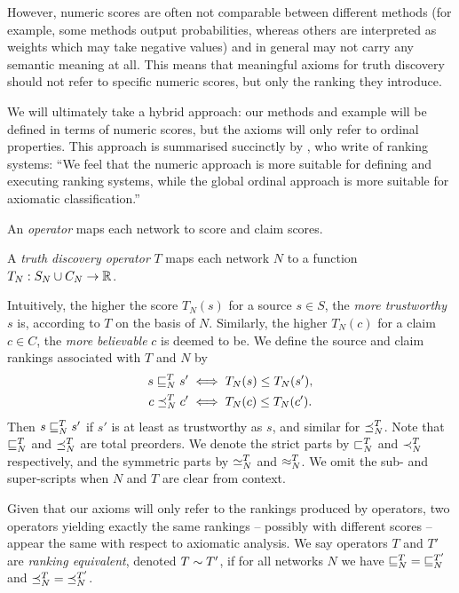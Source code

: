 However, numeric scores are often not comparable between
different methods (for example, some methods output probabilities, whereas
others are interpreted as weights which may take negative values) and in
general may not carry any semantic meaning at all. This means that meaningful
axioms for truth discovery should not refer to specific numeric scores, but
only the ranking they introduce.

We will ultimately take a hybrid approach: our methods and example will be
defined in terms of numeric scores, but the axioms will only refer to ordinal
properties. This approach is summarised succinctly by \textcite{altman2008},
who write of ranking systems: ``We feel that the numeric approach is more
suitable for defining and executing ranking systems, while the global ordinal
approach is more suitable for axiomatic classification.''

An \emph{operator} maps each network to score and claim scores.

\begin{definition}
    A \emph{truth discovery operator} $T$ maps each network $N$ to a function
    $T_N: S_N \cup C_N \to \mathbb{R}$.
\end{definition}

Intuitively, the higher the score $T_N(s)$ for a source $s \in S$, the
\emph{more trustworthy} $s$ is, according to $T$ on the basis of $N$.
Similarly, the higher $T_N(c)$ for a claim $c \in C$, the \emph{more
believable} $c$ is deemed to be. We define the source and claim rankings
associated with $T$ and $N$ by
\begin{align*}
    s \sqsubseteq_N^T s' &\iff T_N(s) \le T_N(s'), \\
    c \preceq_N^T c' &\iff T_N(c) \le T_N(c').
\end{align*}
Then $s \sqsubseteq_N^T s'$ if $s'$ is at least as trustworthy as $s$, and similar for
$\preceq_N^T$. Note that $\sqsubseteq_N^T$ and $\preceq_N^T$ are total preorders. We denote
the strict parts by $\sqsubset_N^T$ and $\prec_N^T$ respectively, and the symmetric
parts by $\simeq_N^T$ and $\approx_N^T$. We omit the sub- and super-scripts when
$N$ and $T$ are clear from context.

Given that our axioms will only refer to the rankings produced by operators,
two operators yielding exactly the same rankings -- possibly with different
scores -- appear the same with respect to axiomatic analysis. We say operators
$T$ and $T'$ are \emph{ranking equivalent}, denoted $T \sim T'$, if for
all networks $N$ we have ${\sqsubseteq_N^T} = {\sqsubseteq_N^{T'}}$ and ${\preceq_N^T} =
{\preceq_N^{T'}}$.

